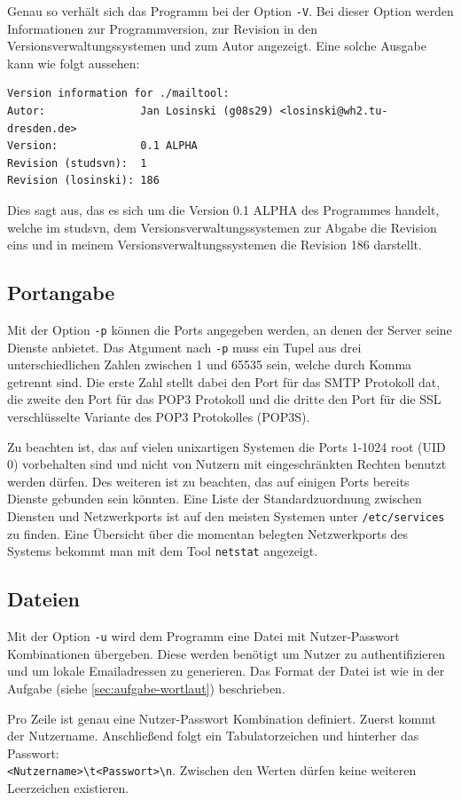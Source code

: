 \documentclass[final,a4paper,11pt,notitlepage,halfparskip]{scrreprt}
\begin{document}
Genau so verhält sich das Programm bei der Option \texttt{-V}. Bei dieser Option
werden Informationen zur Programmversion, zur Revision in den
Versionsverwaltungssystemen und zum Autor angezeigt. Eine solche Ausgabe kann
wie folgt aussehen:
\begin{verbatim}
Version information for ./mailtool:
Autor:               Jan Losinski (g08s29) <losinski@wh2.tu-dresden.de>
Version:             0.1 ALPHA
Revision (studsvn):  1
Revision (losinski): 186
\end{verbatim}
Dies sagt aus, das es sich um die Version 0.1 ALPHA des Programmes handelt,
welche im studsvn, dem Versionsverwaltungssystemen zur Abgabe die Revision eins 
und in meinem Versionsverwaltungssystemen die Revision 186 darstellt.

\subsection{Portangabe}
Mit der Option \texttt{-p} können die Ports angegeben werden, an denen der
Server seine Dienste anbietet. Das Atgument nach \texttt{-p} muss ein Tupel aus
drei unterschiedlichen Zahlen zwischen 1 und 65535 sein, welche durch Komma
getrennt sind. Die erste Zahl stellt dabei den Port für das SMTP Protokoll dat,
die zweite den Port für das POP3 Protokoll und die dritte den Port für die SSL
verschlüsselte Variante des POP3 Protokolles (POP3S). 

Zu beachten ist, das auf vielen unixartigen Systemen die Ports 1-1024 root (UID 
0) vorbehalten sind und nicht von Nutzern mit eingeschränkten Rechten benutzt 
werden dürfen. Des weiteren ist zu beachten, das auf einigen Ports bereits 
Dienste gebunden sein könnten. Eine Liste der Standardzuordnung zwischen 
Diensten und Netzwerkports ist auf den meisten Systemen unter
\texttt{/etc/services} zu finden. Eine Übersicht über die momentan belegten
Netzwerkports des Systems bekommt man mit dem Tool \texttt{netstat} angezeigt.

\subsection{Dateien}
Mit der Option \texttt{-u} wird dem Programm eine Datei mit Nutzer-Passwort
Kombinationen übergeben. Diese werden benötigt um Nutzer zu authentifizieren und
um lokale Emailadressen zu generieren. Das Format der Datei ist wie in der
Aufgabe (siehe \ref{sec:aufgabe-wortlaut}) beschrieben. 

Pro Zeile ist genau eine Nutzer-Passwort Kombination definiert. Zuerst kommt der
Nutzername. Anschließend folgt ein Tabulatorzeichen und hinterher das
Passwort:\\
\texttt{<Nutzername>\textbackslash t<Passwort>\textbackslash n}. Zwischen den
Werten dürfen keine weiteren Leerzeichen existieren.
\end{document}
